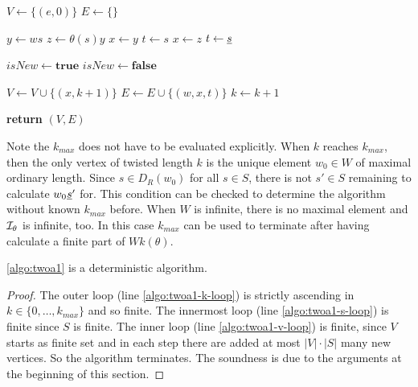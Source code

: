 \begin{algo}[Algorithm 1]
	\hfill
	\begin{algorithmic}[1]
	\State $V \gets \{(e,0)\}$
	\State $E \gets \{\}$

	 \label{algo:twoa1-k-loop}
		 \label{algo:twoa1-v-loop}
			 \label{algo:twoa1-s-loop} 
				\State $y \gets ws$
				\State $z \gets \theta(s)y$
				 
					\State $x \gets y$
					\State $t \gets s$
				\Else
					\State $x \gets z$
					\State $t \gets \underline{s}$
				\EndIf
				
				\State $isNew \gets \textbf{true}$
				 
						\State $isNew \gets \textbf{false}$
					\EndIf
				\EndFor
				
					\State $V \gets V \cup \{ (x,k+1) \}$
				\EndIf
				\State $E \gets E \cup \{ (w,x,t) \}$
			\EndFor
		\EndFor
		\State $k \gets k + 1$
	\EndFor

	\State \textbf{return} $(V,E)$
	\EndProcedure
	\end{algorithmic}
\end{algo}

Note the $k_{max}$ does not have to be evaluated explicitly. When $k$ reaches $k_{max}$, then the only vertex of twisted length $k$ is the unique element $w_0 \in W$ of maximal ordinary length. Since $s \in D_R(w_0)$ for all $s \in S$, there is not $s' \in S$ remaining to calculate $w_0 \underline{s}'$ for. This condition can be checked to determine the algorithm without known $k_{max}$ before. When $W$ is infinite, there is no maximal element and $\mathcal{I}_{\theta}$ is infinite, too. In this case $k_{max}$ can be used to terminate after having calculate a finite part of $Wk(\theta)$.

\begin{lemm}
	\ref{algo:twoa1} is a deterministic algorithm.

	\begin{proof}
		The outer loop (line \ref{algo:twoa1-k-loop}) is strictly ascending in $k \in \{0,\ldots,k_{max}\}$ and so finite. The innermost loop (line \ref{algo:twoa1-s-loop}) is finite since $S$ is finite. The inner loop (line \ref{algo:twoa1-v-loop}) is finite, since $V$ starts as finite set and in each step there are added at most $|V| \cdot |S|$ many new vertices. So the algorithm terminates. The soundness is due to the arguments at the beginning of this section.
	\end{proof}
\end{lemm}

